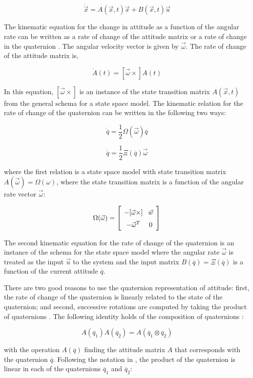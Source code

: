 \documentclass{article}
\newcommand{\mat}[2][ccccccccccccccccccccccccccccccccccccccccccccc]{\left[
        \arraycolsep=4pt\def\arraystretch{1.5}
        \begin{array}{#1} #2 \\ 
        \end{array} 
        \right]}
\begin{document}
\begin{flushleft}
\[ \dot{\vec{x}} = A(\vec{x}, t) \vec{x} + B(\vec{x}, t) \vec{u} \]

The kinematic equation for the change in attitude as a function of the angular rate can be written as a rate of change of the attitude matrix or a rate of change in the quaternion \cite{Shuster1982}. The angular velocity vector is given by $\vec{\omega}$. The rate of change of the attitude matrix is, 

\[ \dot{A}(t) = [\vec{\omega}\times] A(t) \]

In this equation, $[\vec{\omega}\times]$ is an instance of the state transition matrix $A(\vec{x}, t)$ from the general schema for a state space model. The kinematic relation for the rate of change of the quaternion can be written in the following two ways: 

\[ \dot{\overline{q}} = \frac{1}{2} \Omega( \vec{\omega} ) \overline{q} \]

\[ \dot{\overline{q}} = \frac{1}{2} \Xi( \overline{q} )\vec{\omega} \]

where the first relation is a state space model with state transition matrix $A(\vec{\omega}) = \Omega(\omega)$, where the state transition matrix is a function of the angular rate vector $\vec{\omega}$:

\[ \Omega(\vec{\omega}) = \mat{ -[\vec{\omega}\times] & \vec{w} \\ -\vec{\omega}^T & 0 } \] 

The second kinematic equation for the rate of change of the quaternion is an instance of the schema for the state space model where the angular rate $\vec{\omega}$ is treated as the input $\vec{u}$ to the system and the input matrix $B(\overline{q}) = \Xi(\overline{q})$ is a function of the current attitude $\overline{q}$. 

\medskip

There are two good reasons to use the quaternion representation of attitude: first, the rate of change of the quaternion is linearly related to the state of the quaternion; and second, successive rotations are computed by taking the product of quaternions \cite{Markley2007}. The following identity holds of the composition of quaternions \cite{Shuster1982}: 

\[ A(\overline{q}_1) A(\overline{q}_2) = A(\overline{q}_1 \otimes \overline{q}_2) \]

with the operation $A(\overline{q})$ finding the attitude matrix $A$ that corresponds with the quaternion $\overline{q}$. Following the notation in \cite{Markley2007}, the product of the quaternion is linear in each of the quaternions $\overline{q}_1$ and $\overline{q}_2$: 


\end{flushleft}
\end{document}
